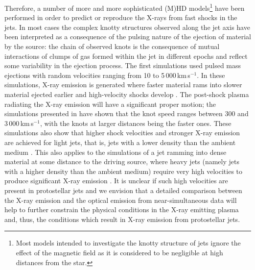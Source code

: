 Therefore, a number of more and more sophisticated (M)HD models\footnote{Most models intended to investigate the knotty structure of jets ignore the effect of the magnetic field as it is considered to be negligible at high distances from the star.} 
have been performed in order to predict or reproduce the X-rays from fast shocks in the jets. 
In most cases the complex knotty structures observed along the jet axis
have been interpreted as a consequence of the pulsing nature of the ejection of material by the source: the
chain of observed knots is the consequence of mutual interactions of clumps of gas formed within
the jet in different epochs and reflect some variability in the ejection process.
The first simulations used pulsed mass ejections with random velocities ranging from 10 to 5\,000\,km\,s$^{-1}$. In these simulations, X-ray emission is generated where faster material rams into slower material ejected earlier and high-velocity shocks develop \citep{Bonito_2010a,Bonito_2010b}. 
The post-shock plasma radiating the X-ray emission 
will have a significant proper motion; the simulations presented in \cite{Bonito_2010b} have shown that the knot speed ranges
between 300 and 3\,000\,km\,s$^{-1}$, with the knots at larger distances being the faster ones.
These simulations also show that higher shock velocities and stronger X-ray emission are achieved for light jets, that is, jets with a lower density than the ambient medium \cite[see also][]{Bonito_2007}. This also applies to the simulations of a jet ramming into dense material at some distance to the driving source, where heavy jets (namely jets with a higher density than the ambient medium) require very high velocities to produce significant X-ray emission  \citep[$\gtrsim1\,000$\,km\,s$^{-1}$, e.g., ][]{Lopez_2015}. It is unclear if such high velocities are present in protostellar jets and we envision that a detailed comparison between the X-ray emission and the optical emission from near-simultaneous data will help to further constrain the physical conditions in the X-ray emitting plasma and, thus, the conditions which result in X-ray emission from protostellar jets.

